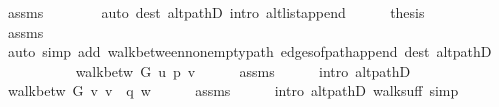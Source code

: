 \begin{isabellebody}
\ assms{\isacharparenleft}{\kern0pt}{}{\isacharparenright}{\kern0pt}\isanewline
\ \ \ \ \ \ \isamarkupfalse%
\ {\isacharparenleft}{\kern0pt}auto\ dest{\isacharcolon}{\kern0pt}\ alt{\isacharunderscore}{\kern0pt}pathD{\isacharparenleft}{\kern0pt}{}{\isacharparenright}{\kern0pt}\ intro{\isacharcolon}{\kern0pt}\ alt{\isacharunderscore}{\kern0pt}list{\isacharunderscore}{\kern0pt}append{\isacharunderscore}{\kern0pt}{}{\isacharparenright}{\kern0pt}\isanewline
\ \ \ \ \isamarkupfalse%
\ {\isacharquery}{\kern0pt}thesis\isanewline
\ \ \ \ \ \ \isamarkupfalse%
\ assms{\isacharparenleft}{\kern0pt}{}{\isacharparenright}{\kern0pt}\isanewline
\ \ \ \ \ \ \isamarkupfalse%
\ {\isacharparenleft}{\kern0pt}auto\ simp\ add{\isacharcolon}{\kern0pt}\ walk{\isacharunderscore}{\kern0pt}between{\isacharunderscore}{\kern0pt}nonempty{\isacharunderscore}{\kern0pt}path{\isacharparenleft}{\kern0pt}{}{\isacharparenright}{\kern0pt}\ edges{\isacharunderscore}{\kern0pt}of{\isacharunderscore}{\kern0pt}path{\isacharunderscore}{\kern0pt}append{\isacharunderscore}{\kern0pt}{}\ dest{\isacharcolon}{\kern0pt}\ alt{\isacharunderscore}{\kern0pt}pathD{\isacharparenleft}{\kern0pt}{}{\isacharparenright}{\kern0pt}{\isacharparenright}{\kern0pt}\isanewline
\ \ \isamarkupfalse%
\isanewline
{}\isamarkupfalse%
\isanewline
\ \ \isamarkupfalse%
\ {}\isanewline
\ \ \isamarkupfalse%
\ {\isachardoublequoteopen}walk{\isacharunderscore}{\kern0pt}betw\ G\ u\ p{\isacharprime}{\kern0pt}\ v{\isachardoublequoteclose}\isanewline
\ \ \ \ \isamarkupfalse%
\ assms{\isacharparenleft}{\kern0pt}{}{\isacharparenright}{\kern0pt}\isanewline
\ \ \ \ \isamarkupfalse%
\ {\isacharparenleft}{\kern0pt}intro\ alt{\isacharunderscore}{\kern0pt}pathD{\isacharparenleft}{\kern0pt}{}{\isacharparenright}{\kern0pt}{\isacharparenright}{\kern0pt}\isanewline
\ \ \isamarkupfalse%
\ \isamarkupfalse%
\ {\isachardoublequoteopen}walk{\isacharunderscore}{\kern0pt}betw\ G\ v\ {\isacharparenleft}{\kern0pt}v\ {\isacharhash}{\kern0pt}\ q{\isacharparenright}{\kern0pt}\ w{\isachardoublequoteclose}\isanewline
\ \ \ \ \isamarkupfalse%
\ assms{\isacharparenleft}{\kern0pt}{}{\isacharparenright}{\kern0pt}\isanewline
\ \ \ \ \isamarkupfalse%
\ {\isacharparenleft}{\kern0pt}intro\ alt{\isacharunderscore}{\kern0pt}pathD{\isacharparenleft}{\kern0pt}{}{\isacharparenright}{\kern0pt}\ walk{\isacharunderscore}{\kern0pt}suff{\isacharparenright}{\kern0pt}\ simp\isanewline

\end{isabellebody}

